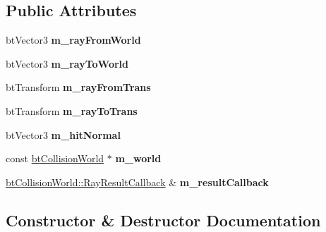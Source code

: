 \subsection*{Public Attributes}
\begin{DoxyCompactItemize}
\item 
\mbox{\label{structbtSingleRayCallback_ae2a8447720a8480dee07885530b7ac7d}} 
bt\+Vector3 {\bfseries m\+\_\+ray\+From\+World}
\item 
\mbox{\label{structbtSingleRayCallback_a0228334519f7103b42fb0f6293e19de6}} 
bt\+Vector3 {\bfseries m\+\_\+ray\+To\+World}
\item 
\mbox{\label{structbtSingleRayCallback_a431584532d7b53e1464755e4e56faef0}} 
bt\+Transform {\bfseries m\+\_\+ray\+From\+Trans}
\item 
\mbox{\label{structbtSingleRayCallback_a0b770d0ef3a7524db67241cc21529d21}} 
bt\+Transform {\bfseries m\+\_\+ray\+To\+Trans}
\item 
\mbox{\label{structbtSingleRayCallback_a47949e35b0315a9b1a6d96c90b7fb41f}} 
bt\+Vector3 {\bfseries m\+\_\+hit\+Normal}
\item 
\mbox{\label{structbtSingleRayCallback_a04d7ba7a47c7e5dfa392dfcc8173ad6f}} 
const \hyperlink{classbtCollisionWorld}{bt\+Collision\+World} $\ast$ {\bfseries m\+\_\+world}
\item 
\mbox{\label{structbtSingleRayCallback_ab2e53b27b67cf629c45c10750c4e74f4}} 
\hyperlink{structbtCollisionWorld_1_1RayResultCallback}{bt\+Collision\+World\+::\+Ray\+Result\+Callback} \& {\bfseries m\+\_\+result\+Callback}
\end{DoxyCompactItemize}


\subsection{Constructor \& Destructor Documentation}
\mbox{\label{structbtSingleRayCallback_a5d29d3242de87c3f298dd3d924bd24fd}} 
